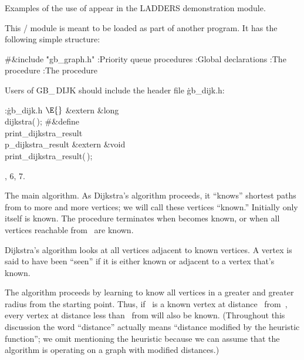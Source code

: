 Examples of the use of  appear in the {\sc LADDERS}
demonstration module.

\fi

This \CEE/ module is meant to be loaded as part of another program.
It has the following simple structure:

\Y\B\8\#\&{include} \.{"gb\_graph.h"}\6
\ATH\7
:Priority queue procedures\X\6
:Global declarations\X\6
:The  procedure\X\6
:The  procedure\X\par
\fi

Users of {\sc GB\_\,DIJK} should include the header file \.{gb\_dijk.h}:

\Y\B\4:\.{gb\_dijk.h }\X${}\E{}$\6
\&{extern} \&{long} \\{dijkstra}(\,);\6
\8\#\&{define} \\{print\_dijkstra\_result}\5\\{p\_dijkstra\_result}\6
\&{extern} \&{void} \\{print\_dijkstra\_result}(\,);\par
{}, 6, 7.\fi

The main algorithm.
As Dijkstra's algorithm proceeds, it ``knows'' shortest paths from 
to more and more vertices; we will call these vertices ``known.''
Initially only  itself is known. The procedure terminates when 
becomes known, or when all vertices reachable from~ are known.

Dijkstra's algorithm looks at all vertices adjacent to known vertices.
A vertex is said to have been ``seen'' if it is either known or
adjacent to a vertex that's known.

The algorithm proceeds by learning to know all vertices in a greater
and greater radius from the starting point. Thus, if ~is a known
vertex at distance~ from~, every vertex at distance less
than~ from
 will also be known.  (Throughout this discussion the word
``distance'' actually means ``distance modified by the heuristic
function''; we omit mentioning the heuristic because we can assume that
the algorithm is operating on a graph with modified distances.)

